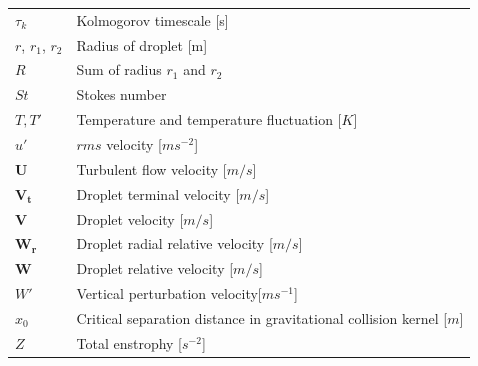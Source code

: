 \documentclass [12pt,letterpaper]{report}
\begin{document}
\begin{flushleft}
\begin{longtable}{p{4cm}p{13cm}}
    $\tau_k$ 		& Kolmogorov timescale [s]\\
    $r$, $r_1$, $r_2$   & Radius of droplet [m]\\
    $R$ 		& Sum of radius $r_1$ and $r_2$\\
    $St$ 		& Stokes number\\
    $T, T\prime$        & Temperature and temperature fluctuation [$K$]\\
    $u\prime$           & $rms$ velocity [$ms^{-2}$]\\
    $\mathbf{U}$ 	& Turbulent flow velocity [$m/s$]\\
    $\mathbf{V_t}$ 	& Droplet terminal velocity [$m/s$]\\
    $\mathbf{V}$ 	& Droplet velocity [$m/s$]\\
    $\mathbf{W_r}$ 	& Droplet radial relative velocity [$m/s$]\\
    $\mathbf{W}$ 	& Droplet relative velocity [$m/s$]\\
    $W\prime$           & Vertical perturbation velocity[$ms^{-1}$]\\
    $x_0$               & Critical separation distance in gravitational collision kernel [$m$]\\
    $Z$                 & Total enstrophy [$s^{-2}$]\\
\end{longtable}
\end{flushleft}


\cleardoublepage
{}




\typeout{}


\typeout{}


\typeout{}


\typeout{}



%

%


\typeout{}
\begin{singlespace}
   
  
\end{singlespace}
\end{document}
